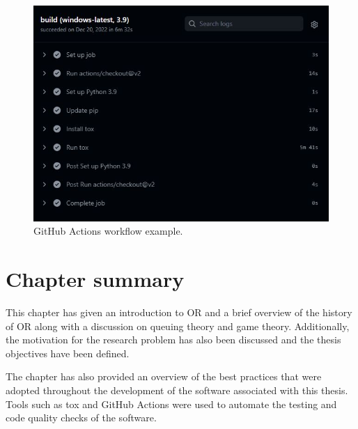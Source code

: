 \begin{figure}[H]
    \includegraphics[width=\linewidth]{chapters/01_introduction/Bin/github_actions.JPG}
    \caption{GitHub Actions workflow example.}
    \label{fig:github_actions}
\end{figure}


\section{Chapter summary}

This chapter has given an introduction to OR and a brief overview of the
history of OR along with a discussion on queuing theory and game theory.
Additionally, the motivation for the research problem has also been discussed
and the thesis objectives have been defined.

The chapter has also provided an overview of the best practices that were
adopted throughout the development of the software associated with this thesis.
Tools such as tox and GitHub Actions were used to automate the testing
and code quality checks of the software.
